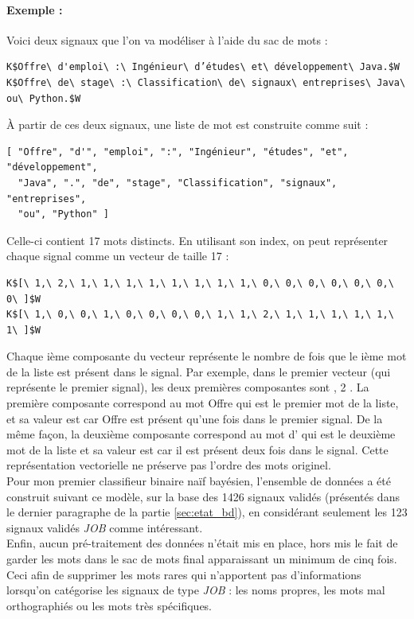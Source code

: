             \paragraph{Exemple :}
                Voici deux signaux que l'on va modéliser à l'aide du sac de mots :
\begin{lstlisting}
K$Offre\ d'emploi\ :\ Ingénieur\ d’études\ et\ développement\ Java.$W
K$Offre\ de\ stage\ :\ Classification\ de\ signaux\ entreprises\ Java\ ou\ Python.$W
\end{lstlisting}
                À partir de ces deux signaux, une liste de mot est construite comme suit :
\begin{verbatim}
[ "Offre", "d'", "emploi", ":", "Ingénieur", "études", "et", "développement",
  "Java", ".", "de", "stage", "Classification", "signaux", "entreprises",
  "ou", "Python" ]
\end{verbatim}
                Celle-ci contient 17 mots distincts. En utilisant son index, on peut représenter chaque signal comme un vecteur de taille 17 :
\begin{lstlisting}
K$[\ 1,\ 2,\ 1,\ 1,\ 1,\ 1,\ 1,\ 1,\ 1,\ 1,\ 0,\ 0,\ 0,\ 0,\ 0,\ 0,\ 0\ ]$W
K$[\ 1,\ 0,\ 0,\ 1,\ 0,\ 0,\ 0,\ 0,\ 1,\ 1,\ 2,\ 1,\ 1,\ 1,\ 1,\ 1,\ 1\ ]$W
\end{lstlisting}
                Chaque ième composante du vecteur représente le nombre de fois que le ième mot de la liste est présent dans le signal. Par exemple, dans le premier vecteur (qui représente le premier signal), les deux premières composantes sont , 2 \fg. La première composante correspond au mot \og Offre \fg qui est le premier mot de la liste, et sa valeur est  \fg car \og Offre \fg est présent qu'une fois dans le premier signal. De la même façon, la deuxième composante correspond au mot \og d' \fg qui est le deuxième mot de la liste et sa valeur est  \fg car il est présent deux fois dans le signal. Cette représentation vectorielle ne préserve pas l'ordre des mots originel.\\

                Pour mon premier classifieur binaire naïf bayésien, l'ensemble de données a été construit suivant ce modèle, sur la base des 1426 signaux validés (présentés dans le dernier paragraphe de la partie \ref{sec:etat_bd}), en considérant seulement les 123 signaux validés \textit{JOB} comme intéressant.\\

                Enfin, aucun pré-traitement des données n'était mis en place, hors mis le fait de garder les mots dans le sac de mots final apparaissant un minimum de cinq fois. Ceci afin de supprimer les mots rares qui n'apportent pas d'informations lorsqu'on catégorise les signaux de type \textit{JOB} : les noms propres, les mots mal orthographiés ou les mots très spécifiques.

